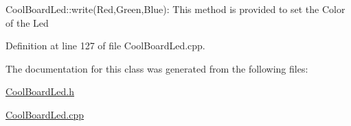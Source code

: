 Cool\+Board\+Led\+::write(\+Red,\+Green,\+Blue)\+: This method is provided to set the Color of the Led 

Definition at line 127 of file Cool\+Board\+Led.\+cpp.



The documentation for this class was generated from the following files\+:\begin{DoxyCompactItemize}
\item 
\hyperlink{_cool_board_led_8h}{Cool\+Board\+Led.\+h}\item 
\hyperlink{_cool_board_led_8cpp}{Cool\+Board\+Led.\+cpp}\end{DoxyCompactItemize}
